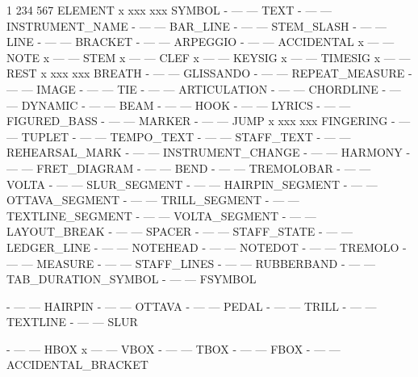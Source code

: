 \begin{DoxyCode}
1 234 567 ELEMENT
x xxx xxx SYMBOL
- --- --- TEXT
- --- --- INSTRUMENT\_NAME
- --- --- BAR\_LINE
- --- --- STEM\_SLASH
- --- --- LINE
- --- --- BRACKET
- --- --- ARPEGGIO
- --- --- ACCIDENTAL
x --- --- NOTE
x --- --- STEM
x --- --- CLEF
x --- --- KEYSIG
x --- --- TIMESIG
x --- --- REST
x xxx xxx BREATH
- --- --- GLISSANDO
- --- --- REPEAT\_MEASURE
- --- --- IMAGE
- --- --- TIE
- --- --- ARTICULATION
- --- --- CHORDLINE
- --- --- DYNAMIC
- --- --- BEAM
- --- --- HOOK
- --- --- LYRICS
- --- --- FIGURED\_BASS
- --- --- MARKER
- --- --- JUMP
x xxx xxx FINGERING
- --- --- TUPLET
- --- --- TEMPO\_TEXT
- --- --- STAFF\_TEXT
- --- --- REHEARSAL\_MARK
- --- --- INSTRUMENT\_CHANGE
- --- --- HARMONY
- --- --- FRET\_DIAGRAM
- --- --- BEND
- --- --- TREMOLOBAR
- --- --- VOLTA
- --- --- SLUR\_SEGMENT
- --- --- HAIRPIN\_SEGMENT
- --- --- OTTAVA\_SEGMENT
- --- --- TRILL\_SEGMENT
- --- --- TEXTLINE\_SEGMENT
- --- --- VOLTA\_SEGMENT
- --- --- LAYOUT\_BREAK
- --- --- SPACER
- --- --- STAFF\_STATE
- --- --- LEDGER\_LINE
- --- --- NOTEHEAD
- --- --- NOTEDOT
- --- --- TREMOLO
- --- --- MEASURE
- --- --- STAFF\_LINES
- --- --- RUBBERBAND
- --- --- TAB\_DURATION\_SYMBOL
- --- --- FSYMBOL

- --- --- HAIRPIN
- --- --- OTTAVA
- --- --- PEDAL
- --- --- TRILL
- --- --- TEXTLINE
- --- --- SLUR

- --- --- HBOX
x --- --- VBOX
- --- --- TBOX
- --- --- FBOX
- --- --- ACCIDENTAL\_BRACKET
\end{DoxyCode}
 